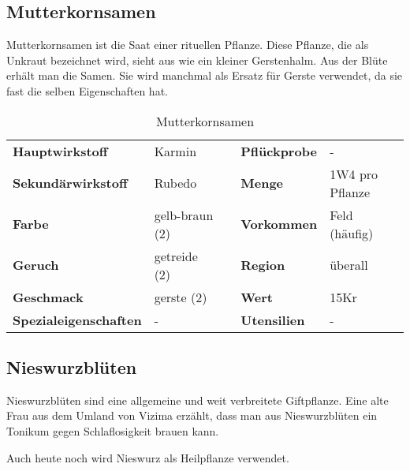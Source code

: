 \subsection{Mutterkornsamen}
Mutterkornsamen ist die Saat einer rituellen Pflanze. Diese Pflanze, die als Unkraut bezeichnet wird, sieht aus wie ein kleiner Gerstenhalm. Aus der Blüte erhält man die Samen. Sie wird manchmal als Ersatz für Gerste verwendet, da sie fast die selben Eigenschaften hat.

\begin{table}[H] 
\begin{center} 
\begin{tabular}{|l|l|p{1cm}|l|l|} 
  	\cline{1-2} \cline{4-5} 
  	\textbf{Hauptwirkstoff} & Karmin && \textbf{Pflückprobe} & - \\ \cline{1-2} \cline{4-5} 
  	\textbf{Sekundärwirkstoff} & Rubedo && \textbf{Menge} & 1W4 pro Pflanze \\ \cline{1-2} \cline{4-5} 
  	\textbf{Farbe} & gelb-braun (2) && \textbf{Vorkommen} & Feld (häufig) \\ \cline{1-2} \cline{4-5} 
  	\textbf{Geruch} & getreide (2) && \textbf{Region} & überall \\ \cline{1-2} \cline{4-5} 
  	\textbf{Geschmack} & gerste (2) && \textbf{Wert} & 15Kr \\ \cline{1-2} \cline{4-5} 
  	\textbf{Spezialeigenschaften} & - && \textbf{Utensilien} & - \\ \cline{1-2} \cline{4-5} 
\end{tabular} 
\end{center} 
\caption{Mutterkornsamen} 
\label{tab:mutterkornsamen} 
\end{table}

\subsection{Nieswurzblüten}
Nieswurzblüten sind eine allgemeine und weit verbreitete Giftpflanze. Eine alte Frau aus dem Umland von Vizima erzählt, dass man aus Nieswurzblüten ein Tonikum gegen Schlaflosigkeit brauen kann.

Auch heute noch wird Nieswurz als Heilpflanze verwendet. 

